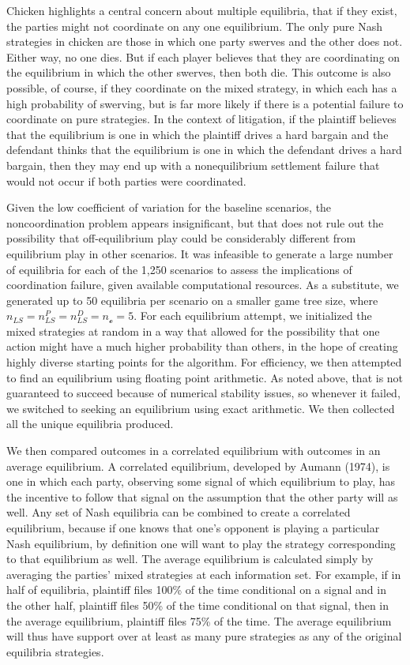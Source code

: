 \documentclass{article}
\begin{document}
Chicken highlights a central concern about multiple equilibria, that if they exist, the parties might not coordinate on any one equilibrium. The only pure Nash strategies in chicken are those in which one party swerves and the other does not. Either way, no one dies. But if each player believes that they are coordinating on the equilibrium in which the other swerves, then both die. This outcome is also possible, of course, if they coordinate on the mixed strategy, in which each has a high probability of swerving, but is far more likely if there is a potential failure to coordinate on pure strategies. In the context of litigation, if the plaintiff believes that the equilibrium is one in which the plaintiff drives a hard bargain and the defendant thinks that the equilibrium is one in which the defendant drives a hard bargain, then they may end up with a nonequilibrium settlement failure that would not occur if both parties were coordinated.

Given the low coefficient of variation for the baseline scenarios, the noncoordination problem appears insignificant, but that does not rule out the possibility that off-equilibrium play could be considerably different from equilibrium play in other scenarios.  It was infeasible to generate a large number of equilibria for each of the 1,250 scenarios to assess the implications of coordination failure, given available computational resources. As a substitute, we generated up to 50 equilibria per scenario on a smaller game tree size, where $n_{LS}=n_{LS}^P=n_{LS}^D=n_{\mathcal{o}}=5$. For each equilibrium attempt, we initialized the mixed strategies at random in a way that allowed for the possibility that one action might have a much higher probability than others, in the hope of creating highly diverse starting points for the algorithm. For efficiency, we then attempted to find an equilibrium using floating point arithmetic. As noted above, that is not guaranteed to succeed because of numerical stability issues, so whenever it failed, we switched to seeking an equilibrium using exact arithmetic. We then collected all the unique equilibria produced. 

We then compared outcomes in a correlated equilibrium with outcomes in an average equilibrium. A correlated equilibrium, developed by Aumann (1974), is one in which each party, observing some signal of which equilibrium to play, has the incentive to follow that signal on the assumption that the other party will as well. Any set of Nash equilibria can be combined to create a correlated equilibrium, because if one knows that one's opponent is playing a particular Nash equilibrium, by definition one will want to play the strategy corresponding to that equilibrium as well. The average equilibrium is calculated simply by averaging the parties' mixed strategies at each information set. For example, if in half of equilibria, plaintiff files 100\% of the time conditional on a signal and in the other half, plaintiff files 50\% of the time conditional on that signal, then in the average equilibrium, plaintiff files 75\% of the time. The average equilibrium will thus have support over at least as many pure strategies as any of the original equilibria strategies. 
\end{document}
